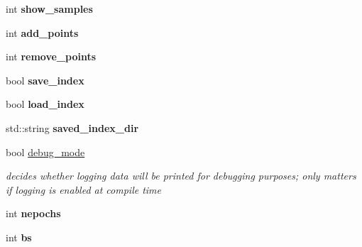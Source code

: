 \begin{DoxyCompactItemize}
\item 
\hypertarget{structmtf_1_1RegNetParams_ad76fa92d1a6c9f985a2b0e0f62c8dfd0}{int {\bfseries show\-\_\-samples}}\label{structmtf_1_1RegNetParams_ad76fa92d1a6c9f985a2b0e0f62c8dfd0}

\item 
\hypertarget{structmtf_1_1RegNetParams_a9e349a811fd387907727f579ab84153e}{int {\bfseries add\-\_\-points}}\label{structmtf_1_1RegNetParams_a9e349a811fd387907727f579ab84153e}

\item 
\hypertarget{structmtf_1_1RegNetParams_a1d9d66d549c1f66a4ebb5a75bee1847b}{int {\bfseries remove\-\_\-points}}\label{structmtf_1_1RegNetParams_a1d9d66d549c1f66a4ebb5a75bee1847b}

\item 
\hypertarget{structmtf_1_1RegNetParams_a72f3eecc2e5b7b9332d72e57b1602178}{bool {\bfseries save\-\_\-index}}\label{structmtf_1_1RegNetParams_a72f3eecc2e5b7b9332d72e57b1602178}

\item 
\hypertarget{structmtf_1_1RegNetParams_a489574e4fd96fc98010d21bc3ca3af5f}{bool {\bfseries load\-\_\-index}}\label{structmtf_1_1RegNetParams_a489574e4fd96fc98010d21bc3ca3af5f}

\item 
\hypertarget{structmtf_1_1RegNetParams_a282d51a8169556fdad4ffe785fa65723}{std\-::string {\bfseries saved\-\_\-index\-\_\-dir}}\label{structmtf_1_1RegNetParams_a282d51a8169556fdad4ffe785fa65723}

\item 
\hypertarget{structmtf_1_1RegNetParams_a0dacc1d60f6dce4e0e85acb08fe751de}{bool \hyperlink{structmtf_1_1RegNetParams_a0dacc1d60f6dce4e0e85acb08fe751de}{debug\-\_\-mode}}\label{structmtf_1_1RegNetParams_a0dacc1d60f6dce4e0e85acb08fe751de}

\begin{DoxyCompactList}\small\item\em decides whether logging data will be printed for debugging purposes; only matters if logging is enabled at compile time \end{DoxyCompactList}\item 
\hypertarget{structmtf_1_1RegNetParams_ad89cf571e14cd46528461f5eff208de1}{int {\bfseries nepochs}}\label{structmtf_1_1RegNetParams_ad89cf571e14cd46528461f5eff208de1}

\item 
\hypertarget{structmtf_1_1RegNetParams_ae77cf663aacc7fc459a559477efa54ba}{int {\bfseries bs}}\label{structmtf_1_1RegNetParams_ae77cf663aacc7fc459a559477efa54ba}


\end{DoxyCompactItemize}
